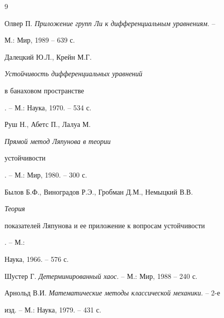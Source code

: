 \begin{thebibliography}{9} 


 




Олвер П. {\em Приложение групп Ли к дифференциальным уравнениям}. -- 


М.: Мир, 1989 -- 639 с. 




Далецкий Ю.Л., Крейн М.Г. {\em Устойчивость дифференциальных уравнений 


в банаховом пространстве}. -- М.: Наука, 1970. -- 534 с. 




Руш Н., Абетс П., Лалуа М. {\em Прямой метод Ляпунова в теории 


устойчивости}. -- М.: Мир, 1980. -- 300 с. 




Былов Б.Ф., Виноградов Р.Э., Гробман Д.М., Немыцкий В.В. {\em Теория 


показателей Ляпунова и ее приложение к вопросам устойчивости}. -- М.: 


Наука, 1966. -- 576 с. 




Шустер Г. {\em Детерминированный хаос}. -- М.: Мир, 1988 -- 240 с. 




Арнольд В.И. {\em Математические методы классической механики}. -- 2-е 


изд. -- М.: Наука, 1979. -- 431 с. 


 


\end{thebibliography} 


 


\vskip 2cm 


 






 


\label{end} 


 


